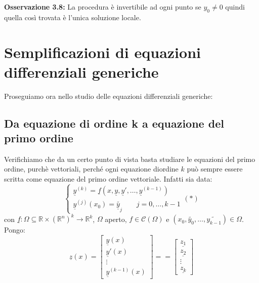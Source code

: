 \documentclass[a4paper,11pt,titlepage]{book}
\begin{document}
\textbf{Osservazione 3.8:} La procedura è invertibile ad ogni punto se $y_0\ne0$ quindi quella così trovata è l'unica soluzione locale.\\

\section{Semplificazioni di equazioni differenziali generiche}

Proseguiamo ora nello studio delle equazioni differenziali generiche:

\subsection{Da equazione di ordine k a equazione del primo ordine}

Verifichiamo che da un certo punto di vista basta studiare le equazioni del primo ordine, purchè vettoriali, perché ogni equazione diordine $k$ può sempre essere scritta come equazione del primo ordine vettoriale. Infatti sia data: $$\begin{cases} \underline{y}^{(k)}=\underline{f}(x,\underline{y},\underline{y}',\ldots,\underline{y}^{(k-1)})\\ \underline{y}^{(j)}(x_0)=\widetilde{\underline{y}_j}\qquad j=0,\ldots,k-1 \end{cases} (*)$$ con $\underline{f}:\Omega\subseteq\mathbb{R}\times(\mathbb{R}^n)^k\to\mathbb{R}^k$, $\Omega$ aperto, $f\in\mathcal{C}(\Omega)$ e $(x_0,\widetilde{y_0},\ldots,\widetilde{y_{k-1}})\in\Omega$. Pongo: $$\underline{z}(x)=\begin{bmatrix} \underline{y}(x)\\ \underline{y}'(x) \\ \vdots \\ \underline{y}^{(k-1)}(x) \end{bmatrix} = = \begin{bmatrix}
\underline{z_1} \\ \underline{z_2} \\ \vdots \\ \underline{z_k} \end{bmatrix}$$
\end{document}
